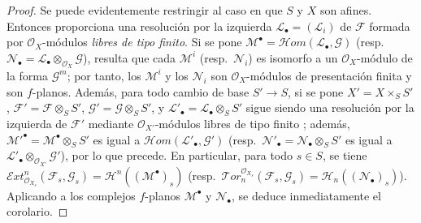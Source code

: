 \begin{proof}
Se puede evidentemente restringir al caso en que $S$ y $X$ son afines.
Entonces  proporciona una resolución por la izquierda $\mathcal L_\bullet=(\mathcal L_i)$ de $\mathcal F$ formada por $\mathcal O_X$-módulos \emph{libres de tipo finito}.
Si se pone $\mathcal M^\bullet=\mathscr{H}\!om(\mathcal L_\bullet,\mathcal G)$ (resp.\ $\mathcal N_\bullet=\mathcal L_\bullet\otimes_{\mathcal O_X}\mathcal G$), resulta que cada $\mathcal M^i$ (resp.\ $\mathcal N_i$) es isomorfo a un $\mathcal O_X$-módulo de la forma $\mathcal G^m$; por tanto, los $\mathcal M^i$ y los $\mathcal N_i$ son $\mathcal O_X$-módulos de presentación finita y son $f$-planos.
Además, para todo cambio de base $S'\to S$, si se pone
$X'=X\times_SS'$, $\mathcal F'=\mathcal F\otimes_SS'$, $\mathcal G'=\mathcal G\otimes_SS'$, y
$\mathcal L'_\bullet
=\mathcal L_\bullet\otimes_SS'$ sigue siendo una resolución por la izquierda de $\mathcal F'$ mediante $\mathcal O_{X'}$-módulos libres de tipo finito ; además,
$\mathcal M'^\bullet=\mathcal M^\bullet\otimes_SS'$ es igual a $\mathscr{H}\!om(\mathcal L'_\bullet,\mathcal G')$
(resp.\ $\mathcal N'_\bullet=\mathcal N_\bullet\otimes_SS'$ es igual a $\mathcal L'_\bullet\otimes_{\mathcal O_{X'}}\mathcal G'$), por lo que precede.
En particular, para todo $s\in S$, se tiene
$\mathscr{E}\!xt^n_{\mathcal O_{X_s}}(\mathcal F_s,\mathcal G_s)
=\mathcal H^n((\mathcal M^\bullet)_s)$
(resp.\ $\mathscr{T}\!or_n^{\mathcal O_{X_s}}(\mathcal F_s,\mathcal G_s)
=\mathcal H_n((\mathcal N_\bullet)_s)$).
Aplicando  a los complejos $f$-planos $\mathcal M^\bullet$ y $\mathcal N_\bullet$, se deduce inmediatamente el corolario.
\end{proof}

